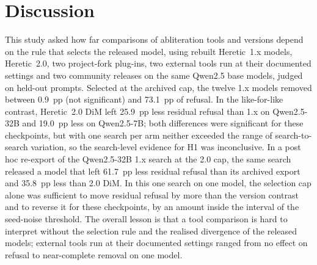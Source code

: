 \section{Discussion}
\label{sec:discussion}

This study asked how far comparisons of abliteration tools and versions depend on the rule that selects the released
model, using rebuilt Heretic~1.x models, Heretic~2.0, two project-fork plug-ins, two external tools run at their
documented settings and two community releases on the same Qwen2.5 base models, judged on held-out prompts. Selected at
the archived cap, the twelve 1.x models removed between 0.9~pp (not significant) and 73.1~pp of refusal. In the
like-for-like contrast, Heretic~2.0 DiM left 25.9~pp less residual refusal than 1.x on Qwen2.5-32B and 19.0~pp less on
Qwen2.5-7B; both differences were significant for these checkpoints, but with one search per arm neither exceeded the
range of search-to-search variation, so the search-level evidence for H1 was inconclusive. In a post hoc re-export of the
Qwen2.5-32B 1.x search at the 2.0 cap, the same search released a model that left 61.7~pp less residual refusal than
its archived export and 35.8~pp less than 2.0 DiM. In this one search on one model, the selection cap alone was
sufficient to move residual refusal by more than the version contrast and to reverse it for these checkpoints, by an
amount inside the interval of the seed-noise threshold. The overall lesson is that a tool comparison is hard to
interpret without the selection rule and the realised divergence of the released models;
external tools run at their documented settings ranged from no effect on refusal to near-complete removal on one
model.

